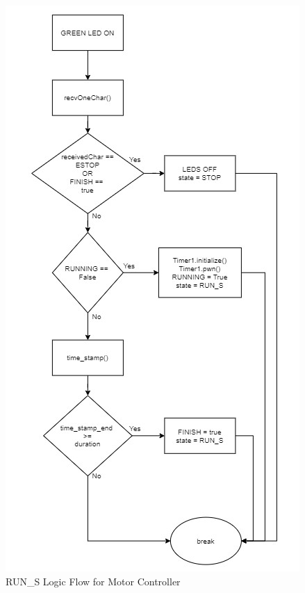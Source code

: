 \documentclass[journal]{IEEEtran}
\begin{document}
        \begin{figure}[H]
            \centering
            \includegraphics[scale = 1]{Images/RUN_S_ver1.jpg}
            \caption{RUN\_S Logic Flow for Motor Controller}
            \label{fig:RUNS_mc}
        \end{figure}
        
        \newpage
        \quad
        \newpage
        
\end{document}
